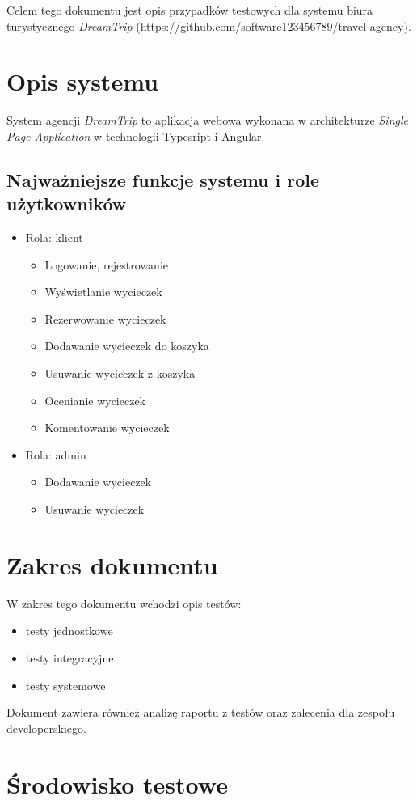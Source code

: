 \documentclass[a4paper,15pt]{article}
\begin{document}
Celem tego dokumentu jest opis przypadków testowych dla systemu biura turystycznego \textit{DreamTrip} (\url{https://github.com/software123456789/travel-agency}). 

\section{Opis systemu}
System agencji \textit{DreamTrip} to aplikacja webowa wykonana w architekturze \textit{Single Page Application} w technologii Typesript i Angular. 
\subsection{Najważniejsze funkcje systemu i role użytkowników} 

\begin{itemize}
\item Rola: klient
\begin{itemize}
\item Logowanie, rejestrowanie
\item Wyświetlanie wycieczek
\item Rezerwowanie wycieczek
\item Dodawanie wycieczek do koszyka
\item Usuwanie wycieczek z koszyka
\item Ocenianie wycieczek
\item Komentowanie wycieczek
\end{itemize} 
\item Rola: admin
\begin{itemize}
\item Dodawanie wycieczek
\item Usuwanie wycieczek
\end{itemize} 
\end{itemize}

\section{Zakres dokumentu}
W zakres tego dokumentu wchodzi opis testów:
\begin{itemize}
\item testy jednostkowe 
\item testy integracyjne
\item testy systemowe
\end{itemize}  
Dokument zawiera również analizę raportu z testów oraz zalecenia dla zespołu developerskiego.


\section{Środowisko testowe}
\end{document}
